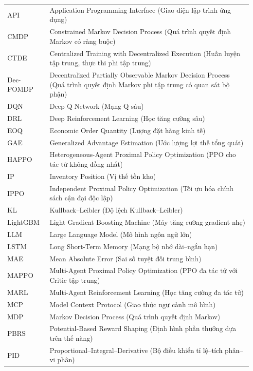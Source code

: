 {
\renewcommand{\arraystretch}{1.5}
\setlength{\LTleft}{0pt}
\begin{longtable}{p{2.5cm} p{12cm}}
API & Application Programming Interface (Giao diện lập trình ứng dụng) \\
CMDP & Constrained Markov Decision Process (Quá trình quyết định Markov có ràng buộc) \\
CTDE & Centralized Training with Decentralized Execution (Huấn luyện tập trung, thực thi phi tập trung) \\
Dec-POMDP & Decentralized Partially Observable Markov Decision Process (Quá trình quyết định Markov phi tập trung có quan sát bộ phận) \\
DQN & Deep Q-Network (Mạng Q sâu) \\
DRL & Deep Reinforcement Learning (Học tăng cường sâu) \\
EOQ & Economic Order Quantity (Lượng đặt hàng kinh tế) \\
GAE & Generalized Advantage Estimation (Ước lượng lợi thế tổng quát) \\
HAPPO & Heterogeneous-Agent Proximal Policy Optimization (PPO cho tác tử không đồng nhất) \\
IP & Inventory Position (Vị thế tồn kho) \\
IPPO & Independent Proximal Policy Optimization (Tối ưu hóa chính sách cận đại độc lập) \\
KL & Kullback--Leibler (Độ lệch Kullback--Leibler) \\
LightGBM & Light Gradient Boosting Machine (Máy tăng cường gradient nhẹ) \\
LLM & Large Language Model (Mô hình ngôn ngữ lớn) \\
LSTM & Long Short-Term Memory (Mạng bộ nhớ dài--ngắn hạn) \\
MAE & Mean Absolute Error (Sai số tuyệt đối trung bình) \\
MAPPO & Multi-Agent Proximal Policy Optimization (PPO đa tác tử với Critic tập trung) \\
MARL & Multi-Agent Reinforcement Learning (Học tăng cường đa tác tử) \\
MCP & Model Context Protocol (Giao thức ngữ cảnh mô hình) \\
MDP & Markov Decision Process (Quá trình quyết định Markov) \\
PBRS & Potential-Based Reward Shaping (Định hình phần thưởng dựa trên thế năng) \\
PID & Proportional--Integral--Derivative (Bộ điều khiển tỉ lệ--tích phân--vi phân) \\

\end{longtable}}
